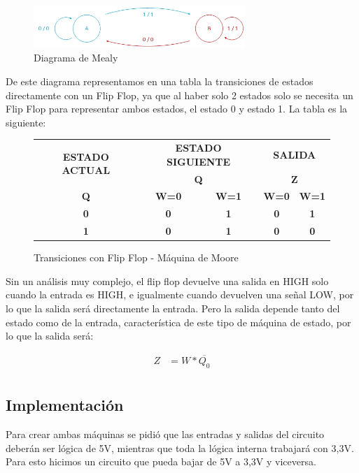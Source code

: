 \documentclass[10pt,a4paper]{article}
\begin{document}
\begin{figure}[hbtp]
	\centering
	\includegraphics[width=8cm]{Imagenes/mealyej3.jpg}
	\caption{Diagrama de Mealy}
\end{figure}

De este diagrama representamos en una tabla la transiciones de estados directamente con un Flip Flop, ya que al haber solo 2 estados solo se necesita un Flip Flop para representar ambos estados, el estado 0 y estado 1. La tabla es la siguiente:

\begin{figure}[H]
	\begin{center}
		\begin{tabular}{|c|c|c|c|c|}
\hline
\multirow{2}{*}{\textbf{ESTADO ACTUAL}} & \multicolumn{2}{c|}{\textbf{ESTADO SIGUIENTE}} & \multicolumn{2}{c|}{\textbf{SALIDA}} \\ \cline{2-5} 
 & \multicolumn{2}{c|}{\textbf{Q}} & \multicolumn{2}{c|}{\textbf{Z}} \\ \hline
\textbf{Q} & \textbf{W=0} & \textbf{W=1} & \textbf{W=0} & \textbf{W=1} \\ \hline
\textbf{0} & \textbf{0} & \textbf{1} & \textbf{0} & \textbf{1} \\ \hline
\textbf{1} & \textbf{0} & \textbf{1} & \textbf{0} & \textbf{0} \\ \hline
		\end{tabular}
		\caption{Transiciones con Flip Flop - Máquina de Moore} 
		\label{3_fig8}
	\end{center}
\end{figure}

Sin un análisis muy complejo, el flip flop devuelve una salida en HIGH solo cuando la entrada es HIGH, e igualmente cuando devuelven una señal LOW, por lo que la salida será directamente la entrada. Pero la salida depende tanto del estado como de la entrada, característica de este tipo de máquina de estado, por lo que la salida será:

\begin{align*}
	Z &= W * \overline{Q_{0}} \\
\end{align*}


\subsection{Implementación}
Para crear ambas máquinas se pidió que las entradas y salidas del circuito deberán ser lógica de 5V, mientras que toda la lógica interna trabajará con 3,3V. Para esto hicimos un circuito que pueda bajar de 5V a 3,3V y viceversa. 
\end{document}
